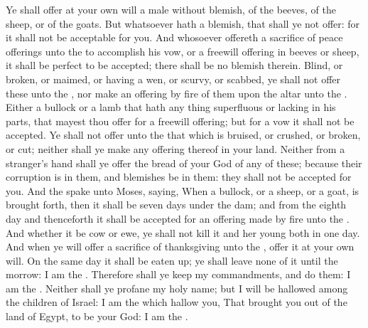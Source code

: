 \begin{biblechapter}
\verse Ye shall offer at your own will a male without blemish, of the beeves, of the sheep, or of the goats.
\verse But whatsoever hath a blemish, that shall ye not offer: for it shall not be acceptable for you.
\verse And whosoever offereth a sacrifice of peace offerings unto the \LORD to accomplish his vow, or a freewill offering in beeves or sheep, it shall be perfect to be accepted; there shall be no blemish therein.
\verse Blind, or broken, or maimed, or having a wen, or scurvy, or scabbed, ye shall not offer these unto the \LORD, nor make an offering by fire of them upon the altar unto the \LORD.
\verse Either a bullock or a lamb that hath any thing superfluous or lacking in his parts, that mayest thou offer for a freewill offering; but for a vow it shall not be accepted.
\verse Ye shall not offer unto the \LORD that which is bruised, or crushed, or broken, or cut; neither shall ye make any offering thereof in your land.
\verse Neither from a stranger's hand shall ye offer the bread of your God of any of these; because their corruption is in them, and blemishes be in them: they shall not be accepted for you.
\verse And the \LORD spake unto Moses, saying,
\verse When a bullock, or a sheep, or a goat, is brought forth, then it shall be seven days under the dam; and from the eighth day and thenceforth it shall be accepted for an offering made by fire unto the \LORD.
\verse And whether it be cow or ewe, ye shall not kill it and her young both in one day.
\verse And when ye will offer a sacrifice of thanksgiving unto the \LORD, offer it at your own will.
\verse On the same day it shall be eaten up; ye shall leave none of it until the morrow: I am the \LORD.
\verse Therefore shall ye keep my commandments, and do them: I am the \LORD.
\verse Neither shall ye profane my holy name; but I will be hallowed among the children of Israel: I am the \LORD which hallow you,
\verse That brought you out of the land of Egypt, to be your God: I am the \LORD.
\end{biblechapter}

